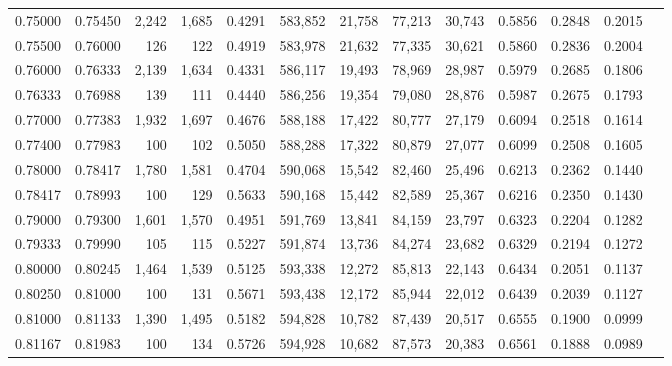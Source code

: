 \begin{tabular}{rrrrrrrrrrrrr}
0.75000 & 0.75450 &  2,242 & 1,685 &                                     0.4291 & 583,852 &  21,758 &  77,213 &  30,743 & 0.5856 & 0.2848 & 0.2015 \\
0.75500 & 0.76000 &    126 &   122 &                                     0.4919 & 583,978 &  21,632 &  77,335 &  30,621 & 0.5860 & 0.2836 & 0.2004 \\
0.76000 & 0.76333 &  2,139 & 1,634 &                                     0.4331 & 586,117 &  19,493 &  78,969 &  28,987 & 0.5979 & 0.2685 & 0.1806 \\
0.76333 & 0.76988 &    139 &   111 &                                     0.4440 & 586,256 &  19,354 &  79,080 &  28,876 & 0.5987 & 0.2675 & 0.1793 \\
0.77000 & 0.77383 &  1,932 & 1,697 &                                     0.4676 & 588,188 &  17,422 &  80,777 &  27,179 & 0.6094 & 0.2518 & 0.1614 \\
0.77400 & 0.77983 &    100 &   102 &                                     0.5050 & 588,288 &  17,322 &  80,879 &  27,077 & 0.6099 & 0.2508 & 0.1605 \\
0.78000 & 0.78417 &  1,780 & 1,581 &                                     0.4704 & 590,068 &  15,542 &  82,460 &  25,496 & 0.6213 & 0.2362 & 0.1440 \\
0.78417 & 0.78993 &    100 &   129 &                                     0.5633 & 590,168 &  15,442 &  82,589 &  25,367 & 0.6216 & 0.2350 & 0.1430 \\
0.79000 & 0.79300 &  1,601 & 1,570 &                                     0.4951 & 591,769 &  13,841 &  84,159 &  23,797 & 0.6323 & 0.2204 & 0.1282 \\
0.79333 & 0.79990 &    105 &   115 &                                     0.5227 & 591,874 &  13,736 &  84,274 &  23,682 & 0.6329 & 0.2194 & 0.1272 \\
0.80000 & 0.80245 &  1,464 & 1,539 &                                     0.5125 & 593,338 &  12,272 &  85,813 &  22,143 & 0.6434 & 0.2051 & 0.1137 \\
0.80250 & 0.81000 &    100 &   131 &                                     0.5671 & 593,438 &  12,172 &  85,944 &  22,012 & 0.6439 & 0.2039 & 0.1127 \\
0.81000 & 0.81133 &  1,390 & 1,495 &                                     0.5182 & 594,828 &  10,782 &  87,439 &  20,517 & 0.6555 & 0.1900 & 0.0999 \\
0.81167 & 0.81983 &    100 &   134 &                                     0.5726 & 594,928 &  10,682 &  87,573 &  20,383 & 0.6561 & 0.1888 & 0.0989 \\

\end{tabular}

